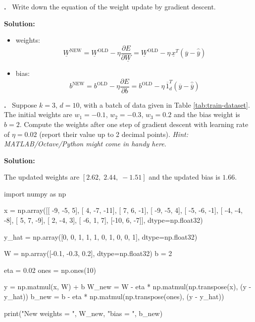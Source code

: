 \documentclass[a4paper,12pt]{article} %
\newcounter{problem}
\newcounter{solution}
\newcommand\Problem{%
	\stepcounter{problem}%
	\textbf{\theproblem.}~%
	\setcounter{solution}{0}%
}
\newcommand\Solution{%
	\textbf{Solution:}\\%
}
\begin{document}
	\Problem{Write down the equation of the weight update by gradient 
	descent.}\medskip
	
	\Solution{	
		\begin{itemize}
		\item weights:
			\begin{equation}
				\underline{W}^{\mathrm{NEW}}=\underline{W}^{\mathrm{OLD}}-\eta 
				\frac{\partial E}{\partial\underline{W}} = 
				\underline{W}^{\mathrm{OLD}}-\eta \, 
				\underline{x}^T(\overline{y}-\hat{\overline{y}})
			\end{equation}
		\item bias:
			\begin{equation}
				{b}^{\mathrm{NEW}}={b}^{\mathrm{OLD}}-\eta 
				\frac{\partial E}{\partial {b}} = {b}^{\mathrm{OLD}}-\eta \, 
				\overline{1}_d^T (\overline{y} -\hat{\overline{y}})
			\end{equation}
		\end{itemize}
	}\vspace{0.4cm}
	
	\Problem{Suppose $k = 3\mbox{, }d =10$, with a batch of data given in Table 
	\ref{tab:train-dataset}. The initial weights are $w_1 = -0.1$, $w_2 = 
	-0.3$, $w_3 = 0.2$ and the bias weight is $b = 2$. Compute the weights 
	after one step of gradient descent with learning rate of $\eta = 0.02$ 
	(report their value up to 2 decimal points). \textit{Hint: 
	MATLAB/Octave/Python might come in handy here.}}\medskip
	
	\Solution{
		The updated weights are $[2.62, \; 2.44, \; -1.51]$ and the updated 
		bias is $1.66$.
		
		\begin{python}
		import numpy as np
			
		x = np.array([[ -9, -5,    5],
					   [   4, -7, -11],
					   [   7,   6,  -1],
					   [ -9, -5,    4],
					   [ -5, -6,  -1],
					   [ -4, -4,  -8],
					   [   5,   7,  -9],
					   [   2, -4,    3],
					   [ -6,   1,    7],
					   [-10,   6,  -7]], 
					   dtype=np.float32)
			
		y_hat = np.array([0, 0, 1, 1, 1, 0, 1, 0, 0, 1], 
						  dtype=np.float32)
			
		W = np.array([-0.1, -0.3, 0.2], 
					  dtype=np.float32)
		b = 2
			
		eta = 0.02
		ones = np.ones(10)
			
		y = np.matmul(x, W) + b
		W_new = W - eta * np.matmul(np.transpose(x), (y - y_hat))
		b_new = b - eta * np.matmul(np.transpose(ones), (y - y_hat))
			
		print("New weights = ", W_new, "\nNew bias = ", b_new)
		\end{python}
		
	}\vspace{0.4cm}
	
\end{document}

